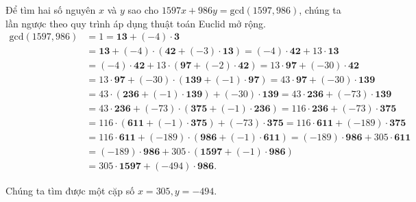 \begin{example}
	Để tìm hai số nguyên $x$ và $y$ sao cho $1597 x + 986 y = \text{gcd}(1597, 986)$, chúng ta lần ngược theo quy trình áp dụng thuật toán Euclid mở rộng.
	\begin{align*}
		\text{gcd}(1597, 986) & = 1 = \mathbf{13} + (-4)\cdot \mathbf{3}                                                                                          \\
		                      & = \mathbf{13} + (-4)\cdot (\mathbf{42} + (-3)\cdot \mathbf{13}) = (-4)\cdot \mathbf{42} + 13\cdot \mathbf{13}                     \\
		                      & = (-4)\cdot \mathbf{42} + 13\cdot (\mathbf{97} + (-2)\cdot \mathbf{42}) = 13\cdot \mathbf{97} + (-30)\cdot \mathbf{42}            \\
		                      & = 13\cdot \mathbf{97} + (-30)\cdot (\mathbf{139} + (-1)\cdot \mathbf{97}) = 43\cdot \mathbf{97} + (-30)\cdot \mathbf{139}         \\
		                      & = 43\cdot (\mathbf{236} + (-1)\cdot \mathbf{139}) + (-30)\cdot \mathbf{139} = 43\cdot \mathbf{236} + (-73)\cdot \mathbf{139}      \\
		                      & = 43\cdot \mathbf{236} + (-73)\cdot (\mathbf{375} + (-1)\cdot \mathbf{236}) = 116\cdot \mathbf{236} + (-73)\cdot \mathbf{375}     \\
		                      & = 116\cdot (\mathbf{611} + (-1)\cdot \mathbf{375}) + (-73)\cdot \mathbf{375} = 116\cdot \mathbf{611} + (-189)\cdot \mathbf{375}   \\
		                      & = 116\cdot \mathbf{611} + (-189)\cdot (\mathbf{986} + (-1)\cdot \mathbf{611})  = (-189)\cdot \mathbf{986} + 305\cdot \mathbf{611} \\
		                      & = (-189)\cdot \mathbf{986} + 305\cdot (\mathbf{1597} + (-1)\cdot \mathbf{986})                                                    \\
		                      & = 305\cdot \mathbf{1597} + (-494)\cdot \mathbf{986}.
	\end{align*}

	Chúng ta tìm được một cặp số $x = 305, y = -494$.
\end{example}


